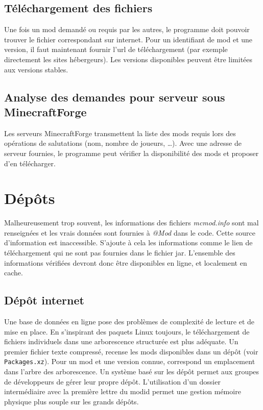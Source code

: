 \documentclass{article}
\begin{document}
\subsection{Téléchargement des fichiers}
Une fois un mod demandé ou requis par les autres, le programme doit pouvoir trouver le fichier correspondant sur internet.
Pour un identifiant de mod et une version, il faut maintenant fournir l'url de téléchargement (par exemple directement les sites hébergeurs).
Les versions disponibles peuvent être limitées aux versions stables.

\subsection{Analyse des demandes pour serveur sous MinecraftForge}
Les serveurs MinecraftForge transmettent la liste des mods requis lors des opérations de salutations (nom, nombre de joueurs, \dots).
Avec une adresse de serveur fournies, le programme peut vérifier la disponibilité des mods et proposer d'en télécharger.


\section{Dépôts}
\label{section:depot}
Malheureusement trop souvent, les informations des fichiers \textit{mcmod.info} sont mal renseignées et les vrais données sont fournies à \textit{@Mod} dans le code.
Cette source d'information est inaccessible.
S'ajoute à cela les informations comme le lien de téléchargement qui ne sont pas fournies dans le fichier jar.
L'ensemble des informations vérifiées devront donc être disponibles en ligne, et localement en cache.

\subsection{Dépôt internet}
Une base de données en ligne pose des problèmes de complexité de lecture et de mise en place.
En s'inspirant des paquets Linux toujours, le téléchargement de fichiers individuels dans une arborescence structurée est plus adéquate.
Un premier fichier texte compressé, recense les mods disponibles dans un dépôt (voir \texttt{Packages.xz}).
Pour un mod et une version connue, correspond un emplacement dans l'arbre des arborescence.
Un système basé sur les dépôt permet aux groupes de développeurs de gérer leur propre dépôt.
L'utilisation d'un dossier intermédiaire avec la première lettre du modid permet une gestion mémoire physique plus souple sur les grands dépôts.
\end{document}
